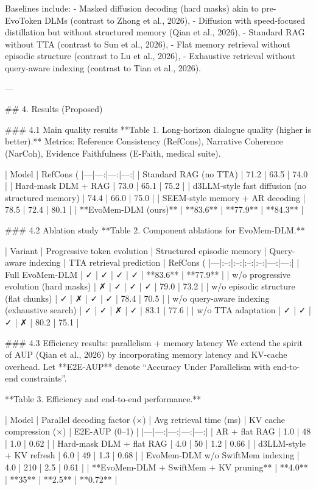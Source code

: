 Baselines include:
- Masked diffusion decoding (hard masks) akin to pre-EvoToken DLMs (contrast to Zhong et al., 2026),
- Diffusion with speed-focused distillation but without structured memory (Qian et al., 2026),
- Standard RAG without TTA (contrast to Sun et al., 2026),
- Flat memory retrieval without episodic structure (contrast to Lu et al., 2026),
- Exhaustive retrieval without query-aware indexing (contrast to Tian et al., 2026).

---

## 4. Results (Proposed)  

### 4.1 Main quality results  
**Table 1. Long-horizon dialogue quality (higher is better).**  
Metrics: Reference Consistency (RefCons), Narrative Coherence (NarCoh), Evidence Faithfulness (E-Faith, medical suite).

| Model | RefCons (%
|---|---:|---:|---:|
| Standard RAG (no TTA) | 71.2 | 63.5 | 74.0 |
| Hard-mask DLM + RAG | 73.0 | 65.1 | 75.2 |
| d3LLM-style fast diffusion (no structured memory) | 74.4 | 66.0 | 75.0 |
| SEEM-style memory + AR decoding | 78.5 | 72.4 | 80.1 |
| **EvoMem-DLM (ours)** | **83.6** | **77.9** | **84.3** |

### 4.2 Ablation study  
**Table 2. Component ablations for EvoMem-DLM.**

| Variant | Progressive token evolution | Structured episodic memory | Query-aware indexing | TTA retrieval prediction | RefCons (%
|---|:--:|:--:|:--:|:--:|---:|---:|
| Full EvoMem-DLM | ✓ | ✓ | ✓ | ✓ | **83.6** | **77.9** |
| w/o progressive evolution (hard masks) | ✗ | ✓ | ✓ | ✓ | 79.0 | 73.2 |
| w/o episodic structure (flat chunks) | ✓ | ✗ | ✓ | ✓ | 78.4 | 70.5 |
| w/o query-aware indexing (exhaustive search) | ✓ | ✓ | ✗ | ✓ | 83.1 | 77.6 |
| w/o TTA adaptation | ✓ | ✓ | ✓ | ✗ | 80.2 | 75.1 |

### 4.3 Efficiency results: parallelism + memory latency  
We extend the spirit of AUP (Qian et al., 2026) by incorporating memory latency and KV-cache overhead. Let **E2E-AUP** denote “Accuracy Under Parallelism with end-to-end constraints”.

**Table 3. Efficiency and end-to-end performance.**

| Model | Parallel decoding factor (×) | Avg retrieval time (ms) | KV cache compression (×) | E2E-AUP (0–1) |
|---|---:|---:|---:|---:|
| AR + flat RAG | 1.0 | 48 | 1.0 | 0.62 |
| Hard-mask DLM + flat RAG | 4.0 | 50 | 1.2 | 0.66 |
| d3LLM-style + KV refresh | 6.0 | 49 | 1.3 | 0.68 |
| EvoMem-DLM w/o SwiftMem indexing | 4.0 | 210 | 2.5 | 0.61 |
| **EvoMem-DLM + SwiftMem + KV pruning** | **4.0** | **35** | **2.5** | **0.72** |

